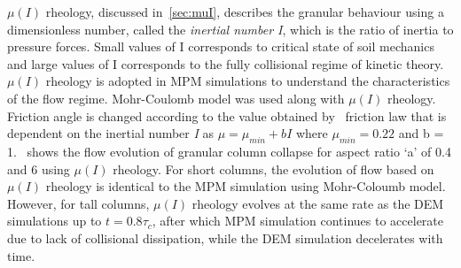 $\mu(I)$ rheology, discussed in~\cref{sec:muI}, describes the granular 
behaviour using a dimensionless number, called the \textit{inertial number I}, 
which is the ratio of inertia to pressure forces. Small values of I 
corresponds to critical state of soil mechanics and large values of I 
corresponds to the fully collisional regime of kinetic theory. $\mu(I)$ 
rheology is adopted in MPM simulations to understand the characteristics of the 
flow regime. Mohr-Coulomb model was used along with $\mu(I)$ rheology. Friction 
angle is changed according to the value obtained by~\citet{DaCruz2005} friction 
law that is dependent on the inertial number \textit{I} as $\mu = \mu_{min} + b 
\mathit{I}$ where $\mu_{min} = 0.22$ and b = 1.~ shows the 
flow evolution of granular column collapse for aspect ratio `a' of 0.4 and 6 
using $\mu(I)$ rheology. For short columns, the evolution of flow based on 
$\mu(I)$ rheology is identical to the MPM simulation using Mohr-Coloumb model. 
However, for tall columns, $\mu(I)$ rheology evolves at the same rate as the 
DEM simulations up to $t = 0.8\tau_c$, after which MPM simulation continues to 
accelerate due to lack of collisional dissipation, while the DEM simulation 
decelerates with time. 

